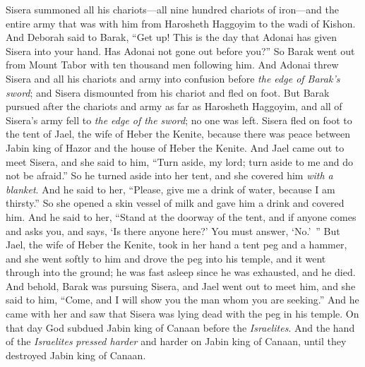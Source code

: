 \begin{biblechapter}
\verse Sisera summoned all his chariots—all nine hundred chariots of iron—and the entire army that was with him from Harosheth Haggoyim to the wadi of Kishon.
\verse And Deborah said to Barak, “Get up! This is the day that Adonai has given Sisera into your hand. Has Adonai not gone out before you?” So Barak went out from Mount Tabor with ten thousand men following him.
\verse And Adonai threw Sisera and all his chariots and army into confusion before \textit{the edge of Barak’s sword}; and Sisera dismounted from his chariot and fled on foot.
\verse But Barak pursued after the chariots and army as far as Harosheth Haggoyim, and all of Sisera’s army fell to \textit{the edge of the sword}; no one was left.
\verse Sisera fled on foot to the tent of Jael, the wife of Heber the Kenite, because there was peace between Jabin king of Hazor and the house of Heber the Kenite.
\verse And Jael came out to meet Sisera, and she said to him, “Turn aside, my lord; turn aside to me and do not be afraid.” So he turned aside into her tent, and she covered him \textit{with a blanket}.
\verse And he said to her, “Please, give me a drink of water, because I am thirsty.” So she opened a skin vessel of milk and gave him a drink and covered him.
\verse And he said to her, “Stand at the doorway of the tent, and if anyone comes and asks you, and says, ‘Is there anyone here?’ You must answer, ‘No.’ ”
\verse But Jael, the wife of Heber the Kenite, took in her hand a tent peg and a hammer, and she went softly to him and drove the peg into his temple, and it went through into the ground; he was fast asleep since he was exhausted, and he died.
\verse And behold, Barak was pursuing Sisera, and Jael went out to meet him, and she said to him, “Come, and I will show you the man whom you are seeking.” And he came with her and saw that Sisera was lying dead with the peg in his temple.
\verse On that day God subdued Jabin king of Canaan before the \textit{Israelites}.
\verse And the hand of the \textit{Israelites} \textit{pressed harder} and harder on Jabin king of Canaan, until they destroyed Jabin king of Canaan.
\end{biblechapter}

